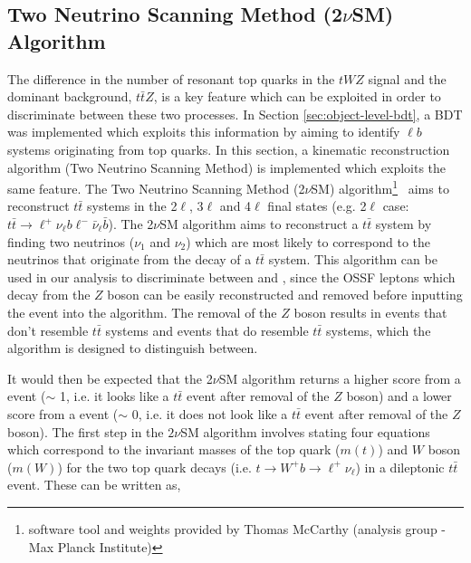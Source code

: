 \subsection{Two Neutrino Scanning Method (2$\nu$SM) Algorithm}
\label{sec:2vsm}
The difference in the number of resonant top quarks in the $tWZ$ signal and the dominant background, $t\bar{t}Z$, is a key feature which can be exploited in order to discriminate between these two processes. In Section \ref{sec:object-level-bdt}, a BDT was implemented which exploits this information by aiming to identify $\ell b$ systems originating from top quarks. In this section, a kinematic reconstruction algorithm (Two Neutrino Scanning Method) is implemented which exploits the same feature. The Two Neutrino Scanning Method (2$\nu$SM) algorithm\footnote{software tool and weights provided by Thomas McCarthy (\ttZ analysis group - Max Planck Institute)}~\cite{2vSM-ref1,2vSM-ref2} aims to reconstruct $t\bar{t}$ systems in the 2$\ell$, 3$\ell$ and 4$\ell$ final states (e.g. 2$\ell$ case: $t\bar{t}\rightarrow \ell^{+}\nu_{\ell}b\ell^{-}\bar{\nu}_{\ell}\bar{b}$). The 2$\nu$SM algorithm aims to reconstruct a $t\bar{t}$ system by finding two neutrinos ($\nu_{1}$ and $\nu_{2}$) which are most likely to correspond to the neutrinos that originate from the decay of a $t\bar{t}$ system. This algorithm can be used in our analysis to discriminate between \tWZ and \ttZ, since the OSSF leptons which decay from the $Z$ boson can be easily reconstructed and removed before inputting the event into the algorithm. The removal of the $Z$ boson results in \tWZ events that don't resemble $t\bar{t}$ systems and \ttZ events that do resemble $t\bar{t}$ systems, which the algorithm is designed to distinguish between. 

It would then be expected that the 2$\nu$SM algorithm returns a higher score from a \ttZ event ($\sim$ 1, i.e. it looks like a $t\bar{t}$ event after removal of the $Z$ boson) and a lower score from a \tWZ event ($\sim$ 0, i.e. it does not look like a $t\bar{t}$ event after removal of the $Z$ boson). The first step in the $2\nu$SM algorithm involves stating four equations which correspond to the invariant masses of the top quark ($m(t)$) and $W$ boson ($m(W)$) for the two top quark decays (i.e. $t\rightarrow W^{+}b \rightarrow \ell^{+} \nu_{\ell}$) in a dileptonic $t\bar{t}$ event. These can be written as,

